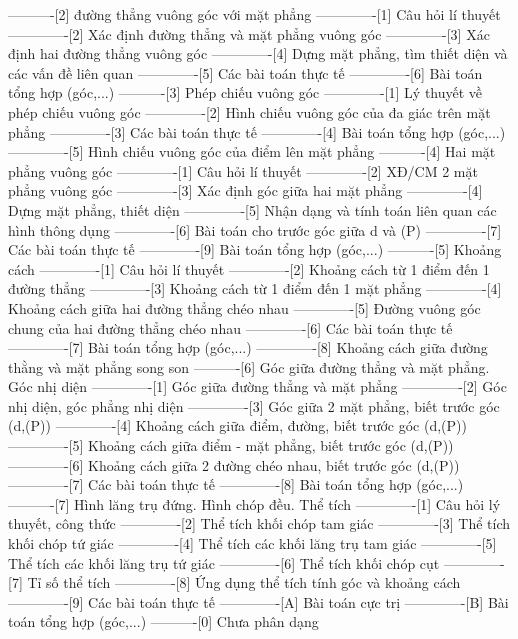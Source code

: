 ----------[2] đường thẳng vuông góc với mặt phẳng
-------------[1] Câu hỏi lí thuyết
-------------[2] Xác định đường thẳng và mặt phẳng vuông góc
-------------[3] Xác định hai đường thẳng vuông góc
-------------[4] Dựng mặt phẳng, tìm thiết diện và các vấn đề liên quan
-------------[5] Các bài toán thực tế
-------------[6] Bài toán tổng hợp (góc,...)
----------[3] Phép chiếu vuông góc
-------------[1] Lý thuyết về phép chiếu vuông góc
-------------[2] Hình chiếu vuông góc của đa giác trên mặt phẳng
-------------[3] Các bài toán thực tế
-------------[4] Bài toán tổng hợp (góc,...)
-------------[5] Hình chiếu vuông góc của điểm lên mặt phẳng
----------[4] Hai mặt phẳng vuông góc
-------------[1] Câu hỏi lí thuyết
-------------[2] XĐ/CM 2 mặt phẳng vuông góc
-------------[3] Xác định góc giữa hai mặt phẳng
-------------[4] Dựng mặt phẳng, thiết diện
-------------[5] Nhận dạng và tính toán liên quan các hình thông dụng
-------------[6] Bài toán cho trước góc giữa d và (P)
-------------[7] Các bài toán thực tế
-------------[9] Bài toán tổng hợp (góc,...)
----------[5] Khoảng cách
-------------[1] Câu hỏi lí thuyết
-------------[2] Khoảng cách từ 1 điểm đến 1 đường thẳng
-------------[3] Khoảng cách từ 1 điểm đến 1 mặt phẳng
-------------[4] Khoảng cách giữa hai đường thẳng chéo nhau
-------------[5] Đường vuông góc chung của hai đường thẳng chéo nhau
-------------[6] Các bài toán thực tế
-------------[7] Bài toán tổng hợp (góc,...)
-------------[8] Khoảng cách giữa đường thằng và mặt phẳng song son
----------[6] Góc giữa đường thẳng và mặt phẳng. Góc nhị diện
-------------[1] Góc giữa đường thẳng và mặt phẳng
-------------[2] Góc nhị diện, góc phẳng nhị diện
-------------[3] Góc giữa 2 mặt phẳng, biết trước góc (d,(P))
-------------[4] Khoảng cách giữa điểm, đường, biết trước góc (d,(P))
-------------[5] Khoảng cách giữa điểm - mặt phẳng, biết trước góc (d,(P))
-------------[6] Khoảng cách giữa 2 đường chéo nhau, biết trước góc (d,(P))
-------------[7] Các bài toán thực tế
-------------[8] Bài toán tổng hợp (góc,...)
----------[7] Hình lăng trụ đứng. Hình chóp đều. Thể tích
-------------[1] Câu hỏi lý thuyết, công thức
-------------[2] Thể tích khối chóp tam giác
-------------[3] Thể tích khối chóp tứ giác
-------------[4] Thể tích các khối lăng trụ tam giác
-------------[5] Thể tích các khối lăng trụ tứ giác
-------------[6] Thể tích khối chóp cụt
-------------[7] Tỉ số thể tích
-------------[8] Ứng dụng thể tích tính góc và khoảng cách
-------------[9] Các bài toán thực tế
-------------[A] Bài toán cực trị
-------------[B] Bài toán tổng hợp (góc,...)
----------[0] Chưa phân dạng
